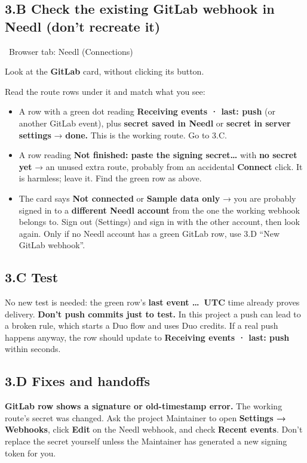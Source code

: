 \documentclass[11pt,a4paper]{article}
\newcommand{\ui}[1]{\textbf{#1}}
\newcommand{\where}[1]{\par\smallskip\noindent\colorbox{winbg}{\color{winfg}\bfseries\strut\ #1\ }\par\nopagebreak[4]}
\begin{document}
\subsection*{3.B Check the existing GitLab webhook in Needl (don't recreate it)}
\where{Browser tab: Needl (Connections)}
\begin{steps}
\item Look at the \ui{GitLab} card, without clicking its button.
\item Read the route rows under it and match what you see:
  \begin{itemize}
  \item A row with a green dot reading \ui{Receiving events · last: push} (or another GitLab event), plus \ui{secret saved in Needl} or \ui{secret in server settings} → \textbf{done.} This is the working route. Go to 3.C.
  \item A row reading \ui{Not finished: paste the signing secret…} with \ui{no secret yet} → an unused extra route, probably from an accidental \ui{Connect} click. It is harmless; leave it. Find the green row as above.
  \item The card says \ui{Not connected} or \ui{Sample data only} → you are probably signed in to a \textbf{different Needl account} from the one the working webhook belongs to. Sign out (Settings) and sign in with the other account, then look again. Only if no Needl account has a green GitLab row, use 3.D “New GitLab webhook”.
  \end{itemize}
\end{steps}

\subsection*{3.C Test}
No new test is needed: the green row's \ui{last event …~UTC} time already proves delivery. \textbf{Don't push commits just to test.} In this project a push can lead to a broken rule, which starts a Duo flow and uses Duo credits. If a real push happens anyway, the row should update to \ui{Receiving events · last: push} within seconds.

\subsection*{3.D Fixes and handoffs}
\textbf{GitLab row shows a signature or old-timestamp error.} The working route's secret was changed. Ask the project Maintainer to open \ui{Settings → Webhooks}, click \ui{Edit} on the Needl webhook, and check \ui{Recent events}. Don't replace the secret yourself unless the Maintainer has generated a new signing token for you.
\end{document}
